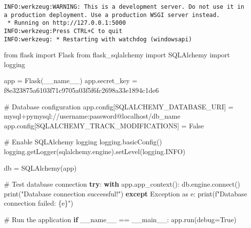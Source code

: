 \documentclass[
  letterpaper,
  DIV=11,
  numbers=noendperiod]{scrreprt}
\newenvironment{Shaded}{\begin{snugshade}}{\end{snugshade}}
\newcommand{\BuiltInTok}[1]{\textcolor[rgb]{0.00,0.23,0.31}{#1}}
\newcommand{\CommentTok}[1]{\textcolor[rgb]{0.37,0.37,0.37}{#1}}
\newcommand{\ControlFlowTok}[1]{\textcolor[rgb]{0.00,0.23,0.31}{\textbf{#1}}}
\newcommand{\ExtensionTok}[1]{\textcolor[rgb]{0.00,0.23,0.31}{#1}}
\newcommand{\ImportTok}[1]{\textcolor[rgb]{0.00,0.46,0.62}{#1}}
\newcommand{\NormalTok}[1]{\textcolor[rgb]{0.00,0.23,0.31}{#1}}
\newcommand{\OperatorTok}[1]{\textcolor[rgb]{0.37,0.37,0.37}{#1}}
\newcommand{\PreprocessorTok}[1]{\textcolor[rgb]{0.68,0.00,0.00}{#1}}
\newcommand{\SpecialCharTok}[1]{\textcolor[rgb]{0.37,0.37,0.37}{#1}}
\newcommand{\SpecialStringTok}[1]{\textcolor[rgb]{0.13,0.47,0.30}{#1}}
\newcommand{\StringTok}[1]{\textcolor[rgb]{0.13,0.47,0.30}{#1}}
\newcommand{\VariableTok}[1]{\textcolor[rgb]{0.07,0.07,0.07}{#1}}
\begin{document}
\begin{verbatim}
INFO:werkzeug:WARNING: This is a development server. Do not use it in a production deployment. Use a production WSGI server instead.
 * Running on http://127.0.0.1:5000
INFO:werkzeug:Press CTRL+C to quit
INFO:werkzeug: * Restarting with watchdog (windowsapi)
\end{verbatim}


\begin{Shaded}
\begin{Highlighting}[]
\ImportTok{from}\NormalTok{ flask }\ImportTok{import}\NormalTok{ Flask}
\ImportTok{from}\NormalTok{ flask\_sqlalchemy }\ImportTok{import}\NormalTok{ SQLAlchemy}
\ImportTok{import}\NormalTok{ logging}

\NormalTok{app }\OperatorTok{=}\NormalTok{ Flask(}\VariableTok{\_\_name\_\_}\NormalTok{)}
\NormalTok{app.secret\_key }\OperatorTok{=} \StringTok{\textquotesingle{}f8e323875a6103f71c9705a03f5f6fc2698a33e1894c1de6\textquotesingle{}}

\CommentTok{\# Database configuration}
\NormalTok{app.config[}\StringTok{\textquotesingle{}SQLALCHEMY\_DATABASE\_URI\textquotesingle{}}\NormalTok{] }\OperatorTok{=} \StringTok{\textquotesingle{}mysql+pymysql://username:password@localhost/db\_name\textquotesingle{}}
\NormalTok{app.config[}\StringTok{\textquotesingle{}SQLALCHEMY\_TRACK\_MODIFICATIONS\textquotesingle{}}\NormalTok{] }\OperatorTok{=} \VariableTok{False}

\CommentTok{\# Enable SQLAlchemy logging}
\NormalTok{logging.basicConfig()}
\NormalTok{logging.getLogger(}\StringTok{\textquotesingle{}sqlalchemy.engine\textquotesingle{}}\NormalTok{).setLevel(logging.INFO)}

\NormalTok{db }\OperatorTok{=}\NormalTok{ SQLAlchemy(app)}

\CommentTok{\# Test database connection}
\ControlFlowTok{try}\NormalTok{:}
    \ControlFlowTok{with}\NormalTok{ app.app\_context():}
\NormalTok{        db.engine.}\ExtensionTok{connect}\NormalTok{()}
        \BuiltInTok{print}\NormalTok{(}\StringTok{"Database connection successful!"}\NormalTok{)}
\ControlFlowTok{except} \PreprocessorTok{Exception} \ImportTok{as}\NormalTok{ e:}
    \BuiltInTok{print}\NormalTok{(}\SpecialStringTok{f"Database connection failed: }\SpecialCharTok{\{}\NormalTok{e}\SpecialCharTok{\}}\SpecialStringTok{"}\NormalTok{)}

\CommentTok{\# Run the application}
\ControlFlowTok{if} \VariableTok{\_\_name\_\_} \OperatorTok{==} \StringTok{\textquotesingle{}\_\_main\_\_\textquotesingle{}}\NormalTok{:}
\NormalTok{    app.run(debug}\OperatorTok{=}\VariableTok{True}\NormalTok{)}
\end{Highlighting}
\end{Shaded}
\end{document}
